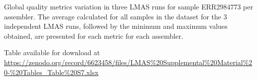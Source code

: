 \begin{table}[]
\centering
\caption{Global quality metrics variation in three LMAS runs for sample ERR2984773 per assembler. The average calculated for all samples in the dataset for the 3 independent LMAS runs, followed by the minimum and maximum values obtained, are presented for each metric for each assembler.}
\label{tab:ch5_suptable7}
Table available for download at \url{https://zenodo.org/record/6623458/files/LMAS\%20Supplemental\%20Material\%20-\%20Tables_Table\%20S7.xlsx}
\end{table}